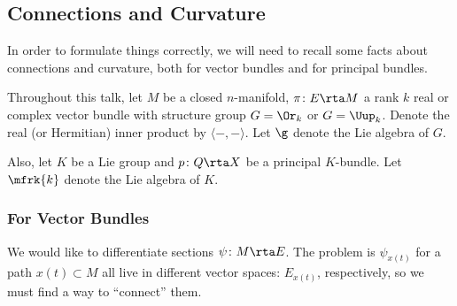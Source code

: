 
\subsection{Connections and Curvature}
In order to formulate things correctly, we will need to recall some facts about connections and curvature, 
both for vector bundles and for principal bundles. 

\begin{convention}
	Throughout this talk, 
	let $M$ be a closed $n$-manifold, $\pi\colon E\rta M$ a rank $k$ real or complex vector bundle with structure group $G = \Or_k $ or $ G = \Uup_k $. 
	Denote the real (or Hermitian) inner product by $\langle -, -\rangle$. 
	Let $\g$ denote the Lie algebra of $G$.

	Also, let $K$ be a Lie group and $p\colon Q\rta X$ be a principal $K$-bundle. 
	Let $\mfrk{k}$ denote the Lie algebra of $K$.
\end{convention}

\subsubsection{For Vector Bundles}
\label{subsubsec:connections_for_vbs}
We would like to differentiate sections $\psi\colon M\rta E$. 
The problem is $\psi_{x(t)}$ for a path $x(t)\subset M$ all live in different vector spaces: $E_{x(t)}$, respectively, so we must find a way to ``connect'' them. 

